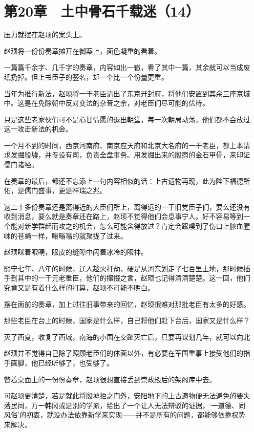 \section{第20章　土中骨石千载迷（14）}

压力就摆在赵顼的案头上。

赵顼将一份份奏章摊开在御案上，面色凝重的看着。

一篇篇千余字、几千字的奏章，内容如出一辙，看了其中一篇，其余就可以当成废纸扔掉。但上书臣子的签名，却一个比一个份量更重。

当年为推行新法，赵顼将一干老臣请出了东京开封府，将他们安置到其余三座京城中。这是在免除朝中反对变法的杂音之余，对老臣们尽可能的优待。

只是这些老家伙们可不是心甘情愿的退出朝堂，每一次朝局动荡，他们都不会放过这一攻击新法的机会。

一个月不到的时间，西京河南府、南京应天府和北京大名府的一干老臣，都上本请求发掘殷墟，并专设有司，负责全盘事务。用发掘出来的殷商的金石甲骨，来印证儒门诸经。

在奏章的最后，都还不忘添上一句内容相似的话：上古遗物再现，此为陛下福德所佑，是儒门盛事，更是祥瑞之兆。

这二十多份奏章还是离得近的大臣们所上，离得远的一干旧党臣子们，要么还没有收到消息，要么就是奏章还在路上，赵顼不觉得他们会息事宁人。好不容易等到一个能对新学群起而攻之的机会，怎么可能舍得放过？肯定会跟嗅到了伤口上脓血腥味的苍蝇一样，嗡嗡嗡的就聚拢了过来。

赵顼眯着眼睛，眼皮的缝隙中闪着冰冷的眼神。

熙宁七年、八年的时候，辽人趁火打劫，硬是从河东划走了七百里土地，那时候插手到其中的一干元老重臣，他们的撺掇之言，赵顼也记得清清楚楚。这一回，他们究竟又是有着什么样的打算，赵顼不可能不明白。

摆在面前的奏章，加上过往旧事带来的回忆，赵顼很难对那批老臣有太多的好感。

那些老臣在台上的时候，国家是什么样，自己将他们赶下台后，国家又是什么样？

灭了西夏，收复了西域，南海的小国在交趾灭亡后，只要再谋划几年，就可以向北

赵顼并不觉得自己除了照顾老臣们的体面以外，有必要在军国重事上接受他们的指手画脚，他已经听够了，也受够了。

瞥着桌面上的一份份奏章，赵顼很想直接丢到崇政殿后的架阁库中去。

可赵顼更清楚，若是就此将殷墟拒之门外，安阳地下的上古遗物便无法避免的要失落民间，万一韩冈或是别的学派，给出了一个让人无法辩驳的证据，‘一道德、同风俗’的初衷，就没办法依靠新学来实现——并不是所有的问题，都能够依靠权势来解决。

